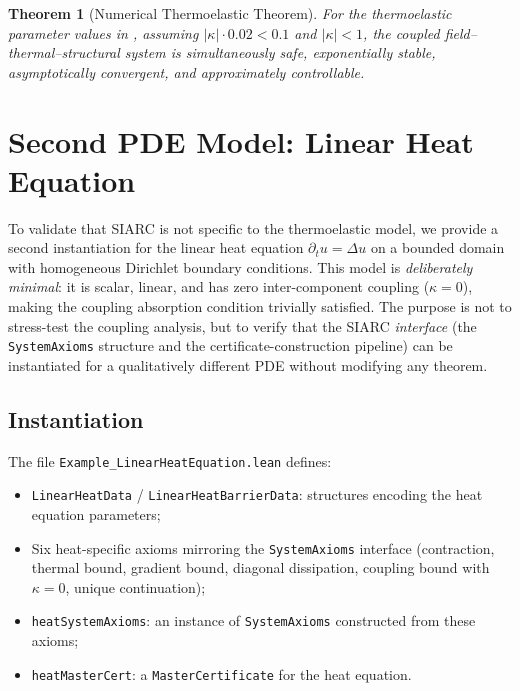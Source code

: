 \documentclass[11pt,a4paper]{article}
\theoremstyle{plain}
\newtheorem{theorem}{Theorem}[section]
\theoremstyle{definition}
\theoremstyle{remark}
\newcommand{\abs}[1]{\lvert #1 \rvert}
\newcommand{\kk}{\kappa}
\newcommand{\leaninline}[1]{\texttt{#1}}
\begin{document}
\begin{theorem}[Numerical Thermoelastic Theorem]\label{thm:numerical}
For the thermoelastic parameter values in , assuming
$\abs{\kk} \cdot 0.02 < 0.1$ and $\abs{\kk} < 1$, the coupled
field--thermal--structural system is simultaneously safe, exponentially
stable, asymptotically convergent, and approximately controllable.
\end{theorem}


\section{Second PDE Model: Linear Heat Equation}\label{sec:heat}

To validate that SIARC is not specific to the thermoelastic model, we
provide a second instantiation for the linear heat equation
$\partial_t u = \Delta u$ on a bounded domain with homogeneous Dirichlet
boundary conditions.  This model is \emph{deliberately minimal}: it is
scalar, linear, and has zero inter-component coupling ($\kk = 0$),
making the coupling absorption condition trivially satisfied.  The
purpose is not to stress-test the coupling analysis, but to verify that
the SIARC \emph{interface} (the \leaninline{SystemAxioms} structure and
the certificate-construction pipeline) can be instantiated for a
qualitatively different PDE without modifying any theorem.

\subsection{Instantiation}

The file \leaninline{Example\_LinearHeatEquation.lean} defines:

\begin{itemize}
  \item \leaninline{LinearHeatData} / \leaninline{LinearHeatBarrierData}:
    structures encoding the heat equation parameters;
  \item Six heat-specific axioms mirroring the \leaninline{SystemAxioms}
    interface (contraction, thermal bound, gradient bound, diagonal
    dissipation, coupling bound with $\kk = 0$, unique continuation);
  \item \leaninline{heatSystemAxioms}: an instance of
    \leaninline{SystemAxioms} constructed from these axioms;
  \item \leaninline{heatMasterCert}: a \leaninline{MasterCertificate}
    for the heat equation.
\end{itemize}
\end{document}
